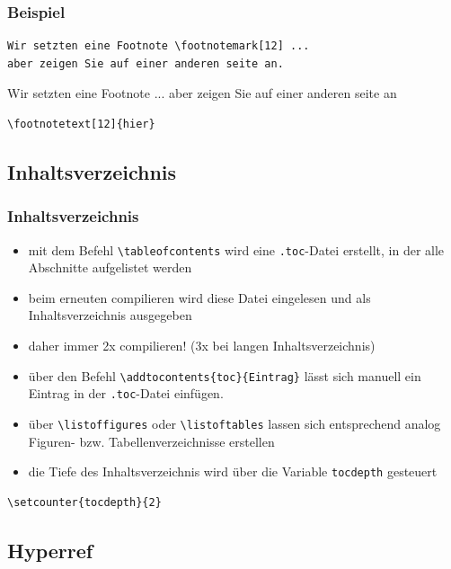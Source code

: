 \begin{frame}[fragile]
\frametitle{Beispiel}
\begin{lstlisting}[style=latex]
Wir setzten eine Footnote \footnotemark[12] ...  
aber zeigen Sie auf einer anderen seite an.
\end{lstlisting}
Wir setzten eine Footnote \footnotemark[12] ...  
aber zeigen Sie auf einer anderen seite an
\end{frame}
\begin{frame}[fragile]
\begin{lstlisting}[style=latex]
\footnotetext[12]{hier}
\end{lstlisting}
\end{frame}

\subsection{Inhaltsverzeichnis}

\begin{frame}[fragile]
\frametitle{Inhaltsverzeichnis}
\begin{itemize}[<+->]
  \item mit dem Befehl \lstinline[style=Latex]+\tableofcontents+ wird eine \texttt{.toc}-Datei erstellt, in der alle Abschnitte aufgelistet werden
  \item beim erneuten compilieren wird diese Datei eingelesen und als Inhaltsverzeichnis ausgegeben
  \item<+-|alert@3> daher immer 2x compilieren! (3x bei langen Inhaltsverzeichnis)
  \item über den Befehl \lstinline[style=Latex]+\addtocontents{toc}{Eintrag}+ lässt sich manuell ein Eintrag in der \texttt{.toc}-Datei einfügen.\\
  \item über \lstinline[style=Latex]+\listoffigures+ oder \lstinline[style=Latex]+\listoftables+ lassen sich entsprechend analog Figuren- bzw. Tabellenverzeichnisse erstellen
  \item die Tiefe des Inhaltsverzeichnis wird über die Variable \texttt{tocdepth} gesteuert
\end{itemize}
\begin{lstlisting}[style=Latex]
\setcounter{tocdepth}{2}
\end{lstlisting}
\end{frame}

\subsection{Hyperref}

